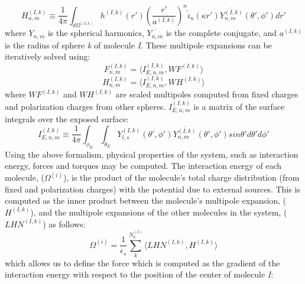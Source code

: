 \documentclass[11pt,titlepage]{article}
\begin{document}
%
\begin{equation}
H_{n,m}^{(I,k)} \equiv  \frac{1}{4\pi} \int_{d\Omega^{(I,k)}} h^{(I,k)}(r') \left (  \frac{ r'}{a^{(I,k)}} \right ) ^{n} \hat{i}_n(\kappa r') \overline{ Y^{(I,k)}_{n,m}} (\theta' , \phi') dr'
\label{eq:hmat}
\end{equation}
%
where \(Y_{n,m}\) is the spherical harmonics, $\overline{Y_{n,m}}$ is the complete conjugate, and \(a^{(I,k)}\) is the radius of sphere \textit{k} of molecule \textit{I}. These multipole expansions can be iteratively solved using:
%
\begin{equation}
F_{n,m}^{(I,k)} = \langle I_{E, n,m} ^{(I,k)}, WF^{(I,k)} \rangle
\label{eq:fmat_it}
\end{equation}
%
\begin{equation}
H_{n,m}^{(I,k)} = \langle I_{E, n,m} ^{(I,k)}, WH^{(I,k)} \rangle
\label{eq:hmat_it}
\end{equation}
%
where $WF^{(I,k)}$ and $WH^{(I,k)}$ are scaled multipoles computed from fixed charges and polarization charges from other spheres. \(I_{E,n,m}^{(I,k)}\) is a matrix of the surface integrals over the exposed surface:
%
\begin{equation}
I_{E, n,m} ^{(I,k)} \equiv \frac{1}{4\pi } \int_{\phi_E} \int_{\theta_E} Y_{l,s}^{(I,k)}  (\theta', \phi') \overline{Y_{n,m}^{(I,k)}} (\theta', \phi') sin \theta' d\theta' d \phi' 
\label{eq:imat}
\end{equation}
%
Using the above formalism, physical properties of the system, such as interaction energy, forces and torques may be computed. The interaction energy of each molecule, ($\Omega^{(i)}$), is the product of the molecule's total charge distribution (from fixed and polarization charges) with the potential due to external sources. This is computed as the inner product between the molecule's multipole expansion, ($H^{(I,k)}$), and the multipole expansions of the other molecules in the system, ($LHN^{(I,k)}$) as follows:
%
\begin{equation}
\Omega^{(i)} = \frac{1}{\epsilon_s} \sum_{k}^{N_k^{(I)}}  \langle LHN^{(I,k)}, H^{(I,k)} \rangle
\label{eq:pbsam_en_interact}
\end{equation}
%
which allows us to define the force which is computed as the gradient of the interaction energy with respect to the position of the center of molecule \textit{I}:
\end{document}
